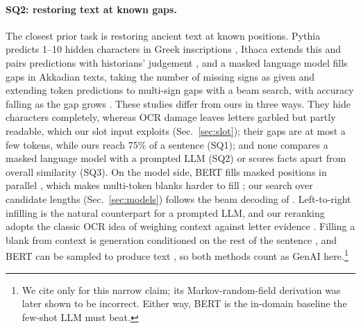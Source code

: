 \paragraph{SQ2: restoring text at known gaps.} The closest prior task is restoring ancient text at known positions.
Pythia predicts 1--10 hidden characters in Greek inscriptions \citep{assael2019restoring}, Ithaca extends this and
pairs predictions with historians' judgement \citep{assael2022restoring}, and a masked language model fills gaps in
Akkadian texts, taking the number of missing signs as given and extending token predictions to multi-sign gaps with
a beam search, with accuracy falling as the gap grows \citep{lazar2021filling}. These studies differ from ours in
three ways. They hide characters completely, whereas OCR damage leaves letters garbled but partly readable, which our
slot input exploits (Sec.~\ref{sec:slot}); their gaps are at most a few tokens, while ours reach 75\% of a sentence
(SQ1); and none compares a masked language model with a prompted LLM (SQ2) or scores facts apart from overall
similarity (SQ3). On the model side, BERT fills masked positions in parallel \citep{devlin2019bert}, which makes
multi-token blanks harder to fill \citep{shen2020blank}; our search over candidate lengths
(Sec.~\ref{sec:models}) follows the beam decoding of \citet{lazar2021filling}. Left-to-right infilling
\citep{donahue2020enabling} is the natural counterpart for a prompted LLM, and our reranking adopts the classic OCR
idea of weighing context against letter evidence \citep{evershed2014correcting}. Filling a blank from context is
generation conditioned on the rest of the sentence \citep{donahue2020enabling}, and BERT can be sampled to produce
text \citep{wang2019bert}, so both methods count as GenAI here.\footnote{We cite \citet{wang2019bert} only for this
narrow claim; its Markov-random-field derivation was later shown to be incorrect. Either way, BERT is the
in-domain baseline the few-shot LLM must beat.}

